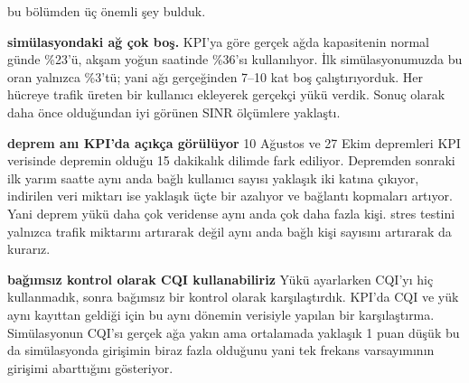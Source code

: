 \documentclass[11pt,a4paper]{article}
\newenvironment{progress}{\par\smallskip\color{blue}}{\par\smallskip}
\begin{document}
\begin{progress}
bu bölümden üç önemli şey bulduk.

\textbf{simülasyondaki ağ çok boş.} KPI'ya göre gerçek ağda kapasitenin normal günde \%23'ü, akşam yoğun saatinde \%36'sı kullanılıyor. İlk simülasyonumuzda bu oran yalnızca \%3'tü; yani ağı gerçeğinden 7--10 kat boş çalıştırıyorduk. Her hücreye trafik üreten bir kullanıcı ekleyerek gerçekçi yükü verdik. Sonuç olarak daha önce olduğundan iyi görünen SINR ölçümlere yaklaştı.

\textbf{deprem anı KPI'da açıkça görülüyor} 10 Ağustos ve 27 Ekim depremleri KPI verisinde depremin olduğu 15 dakikalık dilimde fark ediliyor. Depremden sonraki ilk yarım saatte aynı anda bağlı kullanıcı sayısı yaklaşık iki katına çıkıyor, indirilen veri miktarı ise yaklaşık üçte bir azalıyor ve bağlantı kopmaları artıyor. Yani deprem yükü daha çok veridense aynı anda çok daha fazla kişi. stres testini yalnızca trafik miktarını artırarak değil aynı anda bağlı kişi sayısını artırarak da kurarız.

\textbf{bağımsız kontrol olarak CQI kullanabiliriz} Yükü ayarlarken CQI'yı hiç kullanmadık, sonra bağımsız bir kontrol olarak karşılaştırdık. KPI'da CQI ve yük aynı kayıttan geldiği için bu aynı dönemin verisiyle yapılan bir karşılaştırma. Simülasyonun CQI'sı gerçek ağa yakın ama ortalamada yaklaşık 1 puan düşük bu da simülasyonda girişimin biraz fazla olduğunu yani tek frekans varsayımının girişimi abarttığını gösteriyor.
\end{progress}
\end{document}
